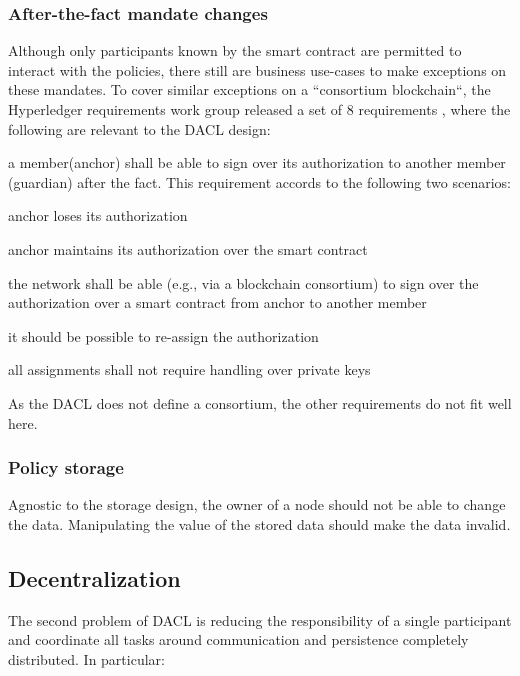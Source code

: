 \documentclass[12pt, conference]{IEEEtran}
\begin{document}
\subsubsection{After-the-fact mandate changes}

Although only participants known by the smart contract are permitted to interact with the policies, there still are business use-cases to make exceptions on these mandates. To cover similar exceptions on a ``consortium blockchain``, the Hyperledger requirements work group released a set of 8 requirements \cite{a1}, where the following are relevant to the DACL design:

\begin{itemize}
\item{a member(anchor) shall be able to sign over its authorization to another member (guardian) after the fact. This requirement accords to the following two scenarios:

\item{anchor loses its authorization}
\item{anchor maintains its authorization over the smart contract}
}
\item the network shall be able (e.g., via a blockchain consortium) to sign over the authorization over a smart contract from anchor to another member
\item it should be possible to re-assign the authorization
\item all assignments shall not require handling over private keys
\end{itemize}

As the DACL does not define a consortium, the other requirements do not fit well here.

\subsubsection{Policy storage}

Agnostic to the storage design, the owner of a node should not be able to change the data. Manipulating the value of the stored data should make the data invalid.


\subsection{Decentralization}

The second problem of DACL is reducing the responsibility of a single participant and coordinate all tasks around communication and persistence completely distributed. In particular:
\end{document}
